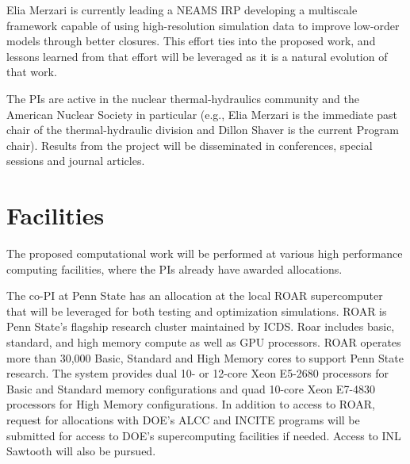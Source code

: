 Elia Merzari is currently leading a NEAMS IRP developing a multiscale framework
capable of using high-resolution simulation data to improve low-order models
through better closures. This effort ties into the proposed work, and lessons
learned from that effort will be leveraged as it is a natural evolution of that
work.

The PIs are active in the nuclear thermal-hydraulics community and the American
Nuclear Society in particular (e.g., Elia Merzari is the immediate past chair
of the thermal-hydraulic division and Dillon Shaver is the current Program
chair). Results from the project will be disseminated in conferences, special
sessions and journal articles.


\section{Facilities}
The proposed computational work will be performed at various high performance
computing facilities, where the PIs already have awarded allocations.

The co-PI at Penn State has an allocation at the local ROAR supercomputer that
will be leveraged for both testing and optimization simulations. ROAR is Penn
State’s flagship research cluster maintained by ICDS. Roar includes basic,
standard, and high memory compute as well as GPU processors. ROAR operates more
than 30,000 Basic, Standard and High Memory cores to support Penn State
research. The system provides dual 10- or 12-core Xeon E5-2680 processors for
Basic and Standard memory configurations and quad 10-core Xeon E7-4830
processors for High Memory configurations. In addition to access to ROAR,
request for allocations with DOE’s ALCC and INCITE programs will be submitted
for access to DOE’s supercomputing facilities if needed. Access to INL Sawtooth
will also be pursued.
%
%
%
%
%
%
